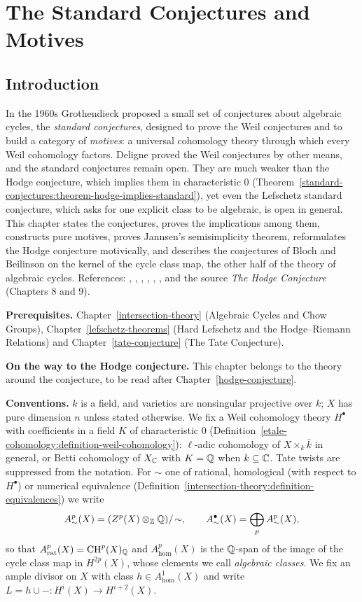\chapter{The Standard Conjectures and Motives}\label{standard-conjectures}

\section{Introduction}\label{standard-conjectures:section-introduction}

In the 1960s Grothendieck proposed a small set of conjectures about algebraic cycles, the \emph{standard conjectures}, designed to prove the Weil conjectures and to build a category of
\emph{motives}: a universal cohomology theory through which every Weil cohomology factors. Deligne proved the Weil conjectures by other means, and the standard conjectures remain open. They
are much weaker than the Hodge conjecture, which implies them in characteristic $0$ (Theorem~\ref{standard-conjectures:theorem-hodge-implies-standard}), yet even the Lefschetz standard
conjecture, which asks for one explicit class to be algebraic, is open in general. This chapter states the conjectures, proves the implications among them, constructs pure motives, proves Jannsen's
semisimplicity theorem, reformulates the Hodge conjecture motivically, and describes the conjectures of Bloch and Beilinson on the kernel of the cycle class map, the other half of the theory of
algebraic cycles. References: \cite{grothendieck-standard}, \cite{kleiman-1968}, \cite{kleiman-1994}, \cite{scholl-1994}, \cite{andre-motifs}, \cite{jannsen-1994}, and the source
\emph{The Hodge Conjecture} (Chapters 8 and 9).

\noindent\textbf{Prerequisites.} Chapter~\ref{intersection-theory} (Algebraic Cycles and Chow Groups), Chapter~\ref{lefschetz-theorems} (Hard Lefschetz and the Hodge--Riemann Relations) and
Chapter~\ref{tate-conjecture} (The Tate Conjecture).

\noindent\textbf{On the way to the Hodge conjecture.} This chapter belongs to the theory around the conjecture, to be read after Chapter~\ref{hodge-conjecture}.

\noindent\textbf{Conventions.} $k$ is a field, and varieties are nonsingular projective over $k$; $X$ has pure dimension $n$ unless stated otherwise. We fix a Weil cohomology theory $H^\bullet$ with
coefficients in a field $K$ of characteristic $0$ (Definition~\ref{etale-cohomology:definition-weil-cohomology}): $\ell$-adic cohomology of $X \times_k\bar k$ in general, or Betti cohomology of $X_{\mathbb{C}}$ with
$K = \mathbb{Q}$ when $k \subseteq \mathbb{C}$. Tate twists are suppressed from the notation. For $\sim$ one of rational, homological (with respect to $H^\bullet$) or numerical equivalence
(Definition~\ref{intersection-theory:definition-equivalences}) we write
\[
A^p_\sim(X) = (Z^p(X) \otimes_{\mathbb{Z}}\mathbb{Q})/\!\sim, \qquad A^\bullet_\sim(X) = \bigoplus_pA^p_\sim(X),
\]
so that $A^p_{\mathrm{rat}}(X) = \operatorname{CH}^p(X)_{\mathbb{Q}}$ and $A^p_{\mathrm{hom}}(X)$ is the $\mathbb{Q}$-span of the image of the cycle class map in $H^{2p}(X)$, whose elements we call \emph{algebraic classes}. We fix an ample divisor on
$X$ with class $h \in A^1_{\mathrm{hom}}(X)$ and write $L = h \cup - \colon H^i(X) \to H^{i+2}(X)$.


